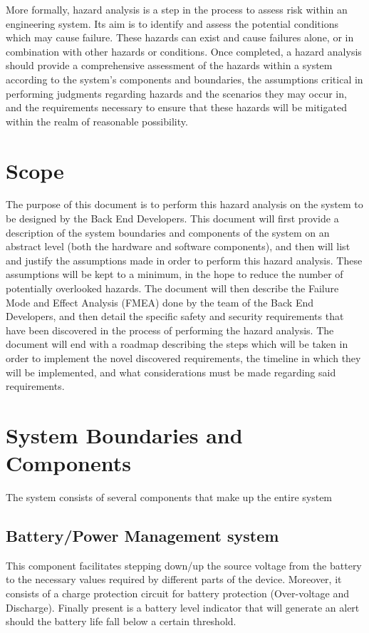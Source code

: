 \documentclass{article}
\begin{document}
More formally, hazard analysis is a step in the process to assess risk within an engineering system. Its aim is to identify and assess the potential conditions which may cause failure. These hazards can exist and cause failures alone, or in combination with other hazards or conditions. Once completed, a hazard analysis should provide a comprehensive assessment of the hazards within a system according to the system's components and boundaries, the assumptions critical in performing judgments regarding hazards and the scenarios they may occur in, and the requirements necessary to ensure that these hazards will be mitigated within the realm of reasonable possibility.

\section{Scope}

The purpose of this document is to perform this hazard analysis on the system to be designed by the Back End Developers. This document will first provide a description of the system boundaries and components of the system on an abstract level (both the hardware and software components), and then will list and justify the assumptions made in order to perform this hazard analysis. These assumptions will be kept to a minimum, in the hope to reduce the number of potentially overlooked hazards. The document will then describe the Failure Mode and Effect Analysis (FMEA) done by the team of the Back End Developers, and then detail the specific safety and security requirements that have been discovered in the process of performing the hazard analysis. The document will end with a roadmap describing the steps which will be taken in order to implement the novel discovered requirements, the timeline in which they will be implemented, and what considerations must be made regarding said requirements.

\section{System Boundaries and Components}
The system consists of several components that make up the entire system

\subsection{\label{Battery_sec}Battery/Power Management system}
This component facilitates stepping down/up the source voltage from the battery to the necessary values required by different parts of the device. Moreover, it consists of a 										charge protection circuit for battery protection (Over-voltage and Discharge). Finally present is a battery level indicator that will generate an alert should the battery life fall below a certain threshold.
\end{document}
